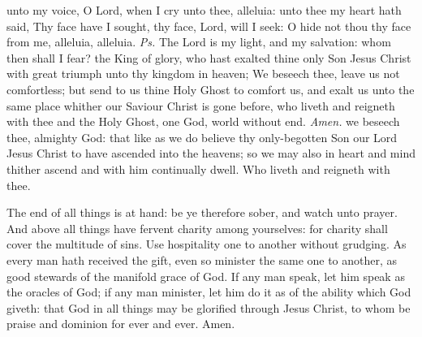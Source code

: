 
\properantiphonfix

\introit
{} unto my voice, O Lord, when I cry unto thee, alleluia: unto thee my heart hath said, Thy face have I sought, thy face, Lord, will I seek: O hide not thou thy face from me, alleluia, alleluia. \textit{Ps.} The Lord is my light, and my salvation: whom then shall I fear?
\collect
{} the King of glory, who hast exalted thine only Son Jesus Christ with great triumph unto thy kingdom in heaven; We beseech thee, leave us not comfortless; but send to us thine Holy Ghost to comfort us, and exalt us unto the same place whither our Saviour Christ is gone before, who liveth and reigneth with thee and the Holy Ghost, one God, world without end. \textit{Amen.}
 we beseech thee, almighty God: that like as we do believe thy only-begotten Son our Lord Jesus Christ to have ascended into the heavens; so we may also in heart and mind thither ascend and with him continually dwell. Who liveth and reigneth with thee.

 The end of all things is at hand: be ye therefore sober, and watch unto prayer. And above all things have fervent charity among yourselves: for charity shall cover the multitude of sins. Use hospitality one to another without grudging. As every man hath received the gift, even so minister the same one to another, as good stewards of the manifold grace of God. If any man speak, let him speak as the oracles of God; if any man minister, let him do it as of the ability which God giveth: that God in all things may be glorified through Jesus Christ, to whom be praise and dominion for ever and ever. Amen.


